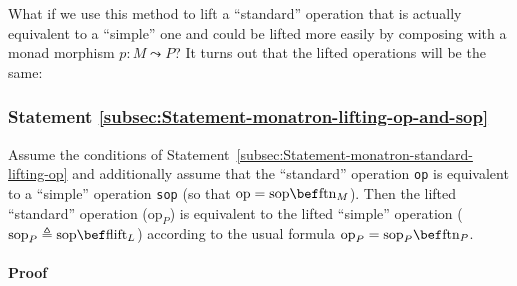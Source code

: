 What if we use this method to lift a \textsf{``}standard\textsf{''} operation that
is actually equivalent to a \textsf{``}simple\textsf{''} one and could be lifted more
easily by composing with a monad morphism $p:M\leadsto P$? It turns
out that the lifted operations will be the same:

\subsubsection{Statement \label{subsec:Statement-monatron-lifting-op-and-sop}\ref{subsec:Statement-monatron-lifting-op-and-sop}}

Assume the conditions of Statement~\ref{subsec:Statement-monatron-standard-lifting-op}
and additionally assume that the \textsf{``}standard\textsf{''} operation \lstinline!op!
is equivalent to a \textsf{``}simple\textsf{''} operation \lstinline!sop! (so that
$\text{op}=\text{sop}\bef\text{ftn}_{M}$). Then the lifted \textsf{``}standard\textsf{''}
operation ($\text{op}_{P}$) is equivalent to the lifted \textsf{``}simple\textsf{''}
operation ($\text{sop}_{P}\triangleq\text{sop}\bef\text{flift}_{L}$)
according to the usual formula $\text{op}_{P}=\text{sop}_{P}\bef\text{ftn}_{P}$.

\paragraph{Proof}

